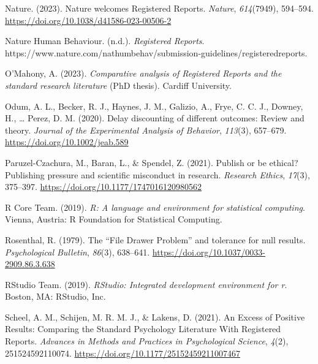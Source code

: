 \documentclass[
  ,man,mask,floatsintext]{apa6}
\newlength{\cslhangindent}
\newlength{\cslentryspacingunit} %
\newenvironment{CSLReferences}[2] %
 {%
  \setlength{\parindent}{0pt}
  \ifodd #1
  \let\oldpar\par
  \def\par{\hangindent=\cslhangindent\oldpar}
  \fi
  \setlength{\parskip}{#2\cslentryspacingunit}
 }%
 {}
\begin{document}
\begin{CSLReferences}{1}{0}
\leavevmode{}%
Nature. (2023). Nature welcomes {Registered Reports}. \emph{Nature}, \emph{614}(7949), 594--594. \url{https://doi.org/10.1038/d41586-023-00506-2}

\leavevmode{}%
Nature Human Behaviour. (n.d.). \emph{Registered {Reports}}. https://www.nature.com/nathumbehav/submission-guidelines/registeredreports.

\leavevmode{}%
O'Mahony, A. (2023). \emph{Comparative analysis of {Registered Reports} and the standard research literature} (PhD thesis). Cardiff University.

\leavevmode{}%
Odum, A. L., Becker, R. J., Haynes, J. M., Galizio, A., Frye, C. C. J., Downey, H., \ldots{} Perez, D. M. (2020). Delay discounting of different outcomes: {Review} and theory. \emph{Journal of the Experimental Analysis of Behavior}, \emph{113}(3), 657--679. \url{https://doi.org/10.1002/jeab.589}

\leavevmode{}%
Paruzel-Czachura, M., Baran, L., \& Spendel, Z. (2021). Publish or be ethical? {Publishing} pressure and scientific misconduct in research. \emph{Research Ethics}, \emph{17}(3), 375--397. \url{https://doi.org/10.1177/1747016120980562}

\leavevmode{}%
R Core Team. (2019). \emph{R: {A} language and environment for statistical computing}. Vienna, Austria: R Foundation for Statistical Computing.

\leavevmode{}%
Rosenthal, R. (1979). The {``{File Drawer Problem}''} and tolerance for null results. \emph{Psychological Bulletin}, \emph{86}(3), 638--641. \url{https://doi.org/10.1037/0033-2909.86.3.638}

\leavevmode{}%
RStudio Team. (2019). \emph{{RStudio}: {Integrated} development environment for r}. Boston, MA: RStudio, Inc.

\leavevmode{}%
Scheel, A. M., Schijen, M. R. M. J., \& Lakens, D. (2021). An {Excess} of {Positive Results}: {Comparing} the {Standard Psychology Literature With Registered Reports}. \emph{Advances in Methods and Practices in Psychological Science}, \emph{4}(2), 251524592110074. \url{https://doi.org/10.1177/25152459211007467}


\end{CSLReferences}
\end{document}
